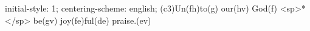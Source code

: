 initial-style: 1;
centering-scheme: english;
(c3)Un(fh)to(g) our(hv) God(f) <sp>*</sp> be(gv) joy(fe)ful(de) praise.(ev)
